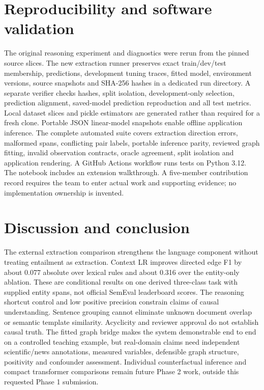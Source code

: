 \documentclass[conference]{IEEEtran}
\begin{document}
\section{Reproducibility and software validation}
The original reasoning experiment and diagnostics were rerun from the pinned source slices. The new extraction runner preserves exact train/dev/test membership, predictions, development tuning traces, fitted model, environment versions, source snapshots and SHA-256 hashes in a dedicated run directory. A separate verifier checks hashes, split isolation, development-only selection, prediction alignment, saved-model prediction reproduction and all test metrics. Local dataset slices and pickle estimators are generated rather than required for a fresh clone. Portable JSON linear-model snapshots enable offline application inference. The complete automated suite covers extraction direction errors, malformed spans, conflicting pair labels, portable inference parity, reviewed graph fitting, invalid observation contracts, oracle agreement, split isolation and application rendering. A GitHub Actions workflow runs tests on Python 3.12. The notebook includes an extension walkthrough. A five-member contribution record requires the team to enter actual work and supporting evidence; no implementation ownership is invented.
\section{Discussion and conclusion}
The external extraction comparison strengthens the language component without treating entailment as extraction. Context LR improves directed edge F1 by about 0.077 absolute over lexical rules and about 0.316 over the entity-only ablation. These are conditional results on one derived three-class task with supplied entity spans, not official SemEval leaderboard scores. The reasoning shortcut control and low positive precision constrain claims of causal understanding. Sentence grouping cannot eliminate unknown document overlap or semantic template similarity. Acyclicity and reviewer approval do not establish causal truth. The fitted graph bridge makes the system demonstrable end to end on a controlled teaching example, but real-domain claims need independent scientific/news annotations, measured variables, defensible graph structure, positivity and confounder assessment. Individual counterfactual inference and compact transformer comparisons remain future Phase 2 work, outside this requested Phase 1 submission.
\end{document}
